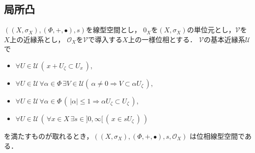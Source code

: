 \subsection{局所凸}
	\begin{screen}
		\begin{thm}[線型位相を導入する近縁系]
		\label{thm:entourages_introducing_vector_topology}
			$\left(\left(X,\sigma_X\right),(\Phi,+,\bullet),s\right)$を線型空間とし，
			$0_X$を$\left(X,\sigma_X\right)$の単位元とし，$\mathscr{V}$を$X$上の近縁系とし，
			$\mathscr{O}_X$を$\mathscr{V}$で導入する$X$上の一様位相とする．
			$\mathscr{V}$の基本近縁系$\mathscr{U}$で
			\begin{itemize}
				\item $\forall U \in \mathscr{U}\, \left(\, x + U_\zeta \subset U_x\, \right)$,
				\item $\forall U \in \mathscr{U}\, \forall \alpha \in \Phi\,
					\exists V \in \mathscr{U} \left(\, \alpha \neq 0 \Longrightarrow V \subset \alpha U_\zeta\, \right)$,
				\item $\forall U \in \mathscr{U}\, \forall \alpha \in \Phi\,
					\left(\, |\alpha| \leq 1 \Longrightarrow \alpha U_\zeta \subset U_\zeta\, \right)$,
				\item $\forall U \in \mathscr{U}\, \left(\, \forall x \in X\, 
				\exists s \in ]0,\infty[\, (\, x \in s U_\zeta\, )\, \right)$
			\end{itemize}
			を満たすものが取れるとき，$\left(\left(X,\sigma_X\right),(\Phi,+,\bullet),s,\mathscr{O}_X\right)$
			は位相線型空間である．
		\end{thm}
	\end{screen}
	

